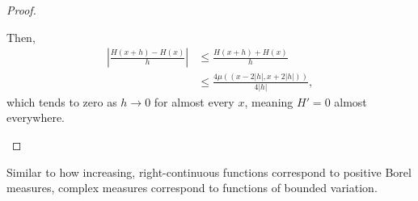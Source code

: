 \documentclass[10pt]{mypackage}
\begin{document}
\begin{proof}
\begin{enumerate}[(a)]
        Then,
        \begin{align*}
          \left\vert \frac{H\left( x+h \right) - H\left( x \right)}{h} \right\vert &\leq \frac{H\left( x+h \right) + H\left( x \right)}{h}\\
                                                                                   &\leq \frac{4\mu\left( \left( x-2\left\vert h \right\vert , x + 2\left\vert h \right\vert\right) \right)}{4\left\vert h \right\vert},
        \end{align*}
        which tends to zero as $h\rightarrow 0$ for almost every $x$, meaning $H' = 0$ almost everywhere.
    \end{enumerate}
  \end{proof}
  Similar to how increasing, right-continuous functions correspond to positive Borel measures, complex measures correspond to functions of bounded variation.
\end{document}
